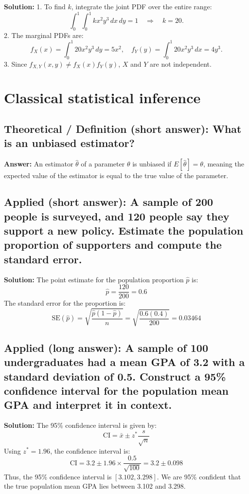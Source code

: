 \documentclass[12pt]{article}
\begin{document}
\textbf{Solution:}
1. To find \( k \), integrate the joint PDF over the entire range:
\[
\int_0^1 \int_0^1 k x^2 y^3 \, dx \, dy = 1 \quad \Rightarrow \quad k = 20.
\]
2. The marginal PDFs are:
\[
f_X(x) = \int_0^1 20 x^2 y^3 \, dy = 5x^2, \quad f_Y(y) = \int_0^1 20 x^2 y^3 \, dx = 4y^3.
\]
3. Since \( f_{X,Y}(x, y) \neq f_X(x) f_Y(y) \), \( X \) and \( Y \) are not independent.


\section{Classical statistical inference}
\subsection{Theoretical / Definition (short answer): What is an unbiased estimator?}

\textbf{Answer:} An estimator \( \hat{\theta} \) of a parameter \( \theta \) is unbiased if \( E[\hat{\theta}] = \theta \), meaning the expected value of the estimator is equal to the true value of the parameter.

\subsection{Applied (short answer): A sample of 200 people is surveyed, and 120 people say they support a new policy. Estimate the population proportion of supporters and compute the standard error.}

\textbf{Solution:}  
The point estimate for the population proportion \( \hat{p} \) is:
\[
\hat{p} = \frac{120}{200} = 0.6
\]
The standard error for the proportion is:
\[
\text{SE}(\hat{p}) = \sqrt{\frac{\hat{p}(1 - \hat{p})}{n}} = \sqrt{\frac{0.6(0.4)}{200}} = 0.03464
\]

\subsection{Applied (long answer): A sample of 100 undergraduates had a mean GPA of 3.2 with a standard deviation of 0.5. Construct a 95\% confidence interval for the population mean GPA and interpret it in context.}

\textbf{Solution:}  
The 95\% confidence interval is given by:
\[
\text{CI} = \bar{x} \pm z^* \frac{s}{\sqrt{n}}
\]
Using \( z^* = 1.96 \), the confidence interval is:
\[
\text{CI} = 3.2 \pm 1.96 \times \frac{0.5}{\sqrt{100}} = 3.2 \pm 0.098
\]
Thus, the 95\% confidence interval is \( [3.102, 3.298] \). We are 95\% confident that the true population mean GPA lies between 3.102 and 3.298.
\end{document}
